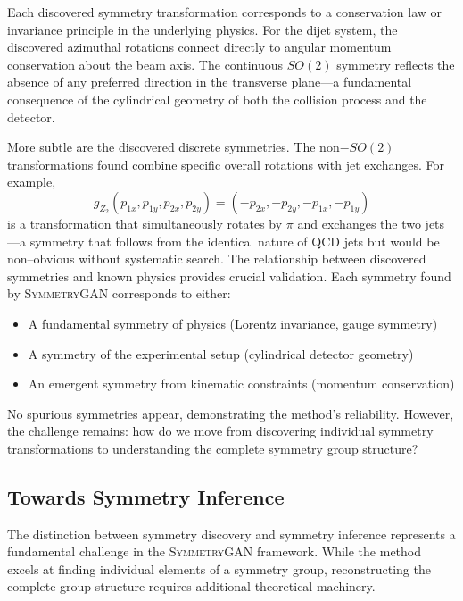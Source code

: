             Each discovered symmetry transformation corresponds to a conservation law or invariance principle in the underlying physics.
            For the dijet system, the discovered azimuthal rotations connect directly to angular momentum conservation about the beam axis.
            The continuous \(SO(2)\) symmetry reflects the absence of any preferred direction in the transverse plane—a fundamental consequence of the cylindrical geometry of both the collision process and the detector.
            
            More subtle are the discovered discrete symmetries.
            The non\(-SO(2)\) transformations found combine specific overall rotations with jet exchanges.
            For example,
            \[
                g_{Z_2}(p_{1x}, p_{1y}, p_{2x}, p_{2y}) = (-p_{2x}, -p_{2y}, -p_{1x}, -p_{1y})
            \]
            is a transformation that simultaneously rotates by \(\pi\) and exchanges the two jets---a symmetry that follows from the identical nature of QCD jets but would be non--obvious without systematic search.        
            The relationship between discovered symmetries and known physics provides crucial validation.
            Each symmetry found by \textsc{SymmetryGAN} corresponds to either:
            \begin{itemize}
                \item A fundamental symmetry of physics (Lorentz invariance, gauge symmetry)
                \item A symmetry of the experimental setup (cylindrical detector geometry)
                \item An emergent symmetry from kinematic constraints (momentum conservation)
            \end{itemize}
            No spurious symmetries appear, demonstrating the method's reliability.
            However, the challenge remains: how do we move from discovering individual symmetry transformations to understanding the complete symmetry group structure?

        \subsection{Towards Symmetry Inference}
            The distinction between symmetry discovery and symmetry inference represents a fundamental challenge in the \textsc{SymmetryGAN} framework.
            While the method excels at finding individual elements of a symmetry group, reconstructing the complete group structure requires additional theoretical machinery.
            

